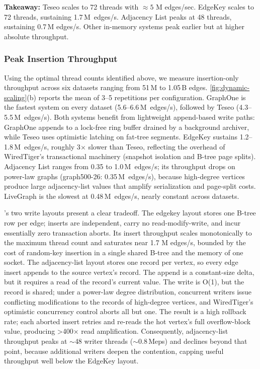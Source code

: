 \textbf{Takeaway:} Teseo scales to 72 threads with $\approx 5$ M edges/sec.
\project{} EdgeKey scales to 72 threads, sustaining 1.7\,M~edges/s. Adjacency List peaks at 48 threads, sustaining 0.7\,M edges/s.
Other in-memory systems peak earlier but at higher absolute throughput.

\subsubsection{Peak Insertion Throughput}
Using the optimal thread counts identified above, we measure insertion-only throughput across six datasets ranging from 51\,M to 1.05\,B edges.
\autoref{fig:dynamic-scaling}(b) reports the mean of 3--5 repetitions per configuration.
GraphOne is the fastest system on every dataset (5.6--6.6\,M~edges/s), followed by Teseo (4.3--5.5\,M~edges/s).
Both systems benefit from lightweight append-based write paths: GraphOne appends to a lock-free ring buffer drained by a background archiver, while Teseo uses optimistic latching on fat-tree segments.
\project{} EdgeKey sustains 1.2--1.8\,M~edges/s, roughly 3$\times$ slower than Teseo, reflecting the overhead of WiredTiger's transactional machinery (snapshot isolation and B-tree page splits).
\project{} Adjacency List ranges from 0.35 to 1.0\,M~edges/s; its throughput drops on power-law graphs (graph500-26: 0.35\,M~edges/s), because high-degree vertices produce large adjacency-list values that amplify serialization and page-split costs.
LiveGraph is the slowest at 0.48\,M~edges/s, nearly constant across datasets.

\project{}'s two write layouts present a clear tradeoff. 
The edgekey layout stores one B-tree row per edge; inserts are independent, carry no read-modify-write, and incur essentially zero transaction aborts. 
Its insert throughput scales monotonically to the maximum thread count and saturates near 1.7 M edges/s, bounded by the cost of random-key insertion in a single shared B-tree and the memory  of one socket.
The adjacency-list layout stores one record per vertex, so every edge insert appends to the source vertex's record. 
The append is a constant-size  delta, but it requires a read of the record's current value.
The write is O(1), but the record is shared; under a power-law degree distribution, concurrent writers issue conflicting modifications to the records of high-degree vertices, and WiredTiger's optimistic concurrency control aborts all but one.
The result is a high rollback rate; each aborted insert retries and re-reads the hot vertex's full overflow-block value, producing >400× read amplification. 
Consequently, adjacency-list throughput peaks at ${\sim}$48 writer threads (${\sim}$0.8\,Meps) and declines beyond that point, because additional writers deepen the contention, capping useful throughput well below the EdgeKey layout.

